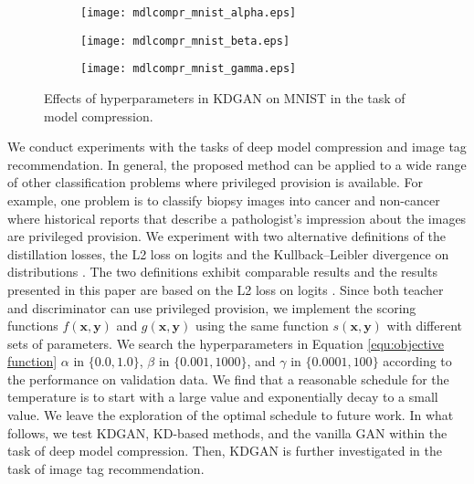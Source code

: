 \documentclass{article}
\newcommand{\OVEC}[1]{\bm{#1}} %
\newcommand{\tchscore}{f(\OVEC{x},\OVEC{y})}
\newcommand{\disscore}{g(\OVEC{x},\OVEC{y})}
\newcommand{\priscore}{s(\OVEC{x},\OVEC{y})}
\begin{document}
\begin{figure}[tbp]
\centering
\setlength{\abovecaptionskip}{4pt plus 0pt minus 0pt}
\begin{subfigure}{0.33\textwidth}
 \centering
 \texttt{[image: mdlcompr\_mnist\_alpha.eps]}
\end{subfigure}
\hspace*{-0.4em} %
\begin{subfigure}{0.33\textwidth}
 \centering
 \texttt{[image: mdlcompr\_mnist\_beta.eps]}
\end{subfigure}
\hspace*{-0.4em} %
\begin{subfigure}{0.33\textwidth}
 \centering
 \texttt{[image: mdlcompr\_mnist\_gamma.eps]}
\end{subfigure}
\caption{ Effects of hyperparameters in KDGAN on MNIST in the task of model compression.  }
\label{fig:deep model compression tuning}
\end{figure}

We conduct experiments with the tasks of deep model compression and image tag recommendation.
In general, the proposed method can be applied to a wide range of other classification problems where privileged provision is available.
For example, one problem is to classify biopsy images into cancer and non-cancer where historical reports that describe a pathologist's impression about the images are privileged provision.
We experiment with two alternative definitions of the distillation losses, the L2 loss on logits \cite{ba2014deep} and the Kullback–Leibler divergence on distributions \cite{hinton2015distilling}.
The two definitions exhibit comparable results and the results presented in this paper are based on the L2 loss on logits \cite{ba2014deep}.
Since both teacher and discriminator can use privileged provision, we implement the scoring functions $\tchscore$ and $\disscore$ using the same function $\priscore$ with different sets of parameters.
We search the hyperparameters in Equation \ref{equ:objective function} $\alpha$ in $\{0.0,1.0\}$, $\beta$ in $\{0.001,1000\}$, and $\gamma$ in $\{0.0001,100\}$ according to the performance on validation data.
We find that a reasonable schedule for the temperature is to start with a large value and exponentially decay to a small value.
We leave the exploration of the optimal schedule to future work.
In what follows, we test KDGAN, KD-based methods, and the vanilla GAN within the task of deep model compression.
Then, KDGAN is further investigated in the task of image tag recommendation.
\end{document}
